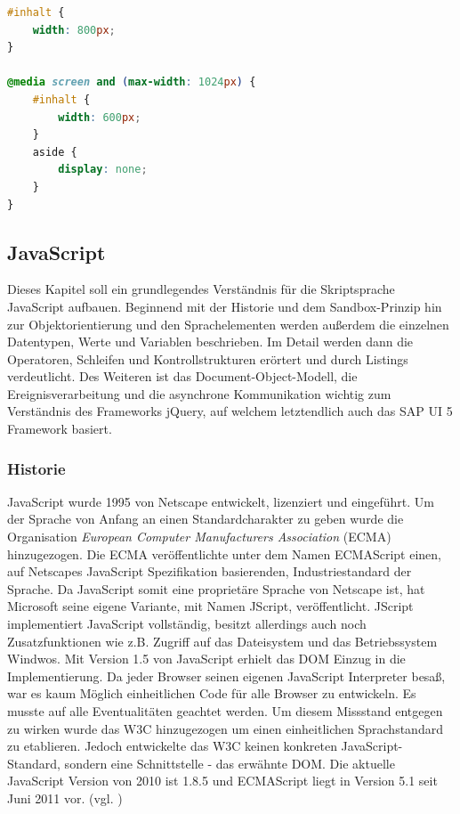 \vspace{1em}
\begin{lstlisting}[language=CSS, caption=CSS3 eigenschaftsspezifisches Stylesheet, label=lst:css3mediaquery]
#inhalt {
	width: 800px;
}
 
@media screen and (max-width: 1024px) {
	#inhalt {
		width: 600px;
	}
	aside {
		display: none;
	}
}
\end{lstlisting}

\subsection{JavaScript}
Dieses Kapitel soll ein grundlegendes Verständnis für die Skriptsprache JavaScript aufbauen. Beginnend mit der Historie und dem Sandbox-Prinzip hin zur Objektorientierung und den Sprachelementen werden außerdem die einzelnen Datentypen, Werte und Variablen beschrieben. Im Detail werden dann die Operatoren, Schleifen und Kontrollstrukturen erörtert und durch Listings verdeutlicht. Des Weiteren ist das Document-Object-Modell, die Ereignisverarbeitung und die asynchrone Kommunikation wichtig zum Verständnis des Frameworks jQuery, auf welchem letztendlich auch das SAP UI 5 Framework basiert.

\subsubsection{Historie} JavaScript wurde 1995 von Netscape entwickelt, lizenziert und eingeführt. Um der Sprache von Anfang an einen Standardcharakter zu geben wurde die Organisation \textit{European Computer Manufacturers Association} (ECMA) hinzugezogen. Die ECMA veröffentlichte unter dem Namen ECMAScript einen, auf Netscapes JavaScript Spezifikation basierenden, Industriestandard der Sprache. Da JavaScript somit eine proprietäre Sprache von Netscape ist, hat Microsoft seine eigene Variante, mit Namen JScript, veröffentlicht. JScript implementiert JavaScript vollständig, besitzt allerdings auch noch Zusatzfunktionen wie z.B. Zugriff auf das Dateisystem und das Betriebssystem Windwos. Mit Version 1.5 von JavaScript erhielt das DOM Einzug in die Implementierung. Da jeder Browser seinen eigenen JavaScript Interpreter besaß, war es kaum Möglich einheitlichen Code für alle Browser zu entwickeln. Es musste auf alle Eventualitäten geachtet werden. Um diesem Missstand entgegen zu wirken wurde das W3C hinzugezogen um einen einheitlichen Sprachstandard zu etablieren. Jedoch entwickelte das W3C keinen konkreten JavaScript-Standard, sondern eine Schnittstelle - das erwähnte DOM. Die aktuelle JavaScript Version von 2010 ist 1.8.5 und ECMAScript liegt in Version 5.1 seit Juni 2011 vor. (vgl. \cite{SelfHtml20146})

